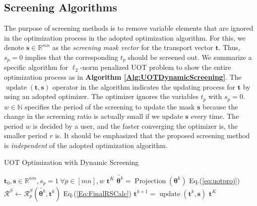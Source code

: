 \documentclass[twoside]{article}
\theoremstyle{plain}
\renewcommand{\vec}[1]{\bm{#1}}
\begin{document}
\subsection{Screening Algorithms}
The purpose of screening methods is to remove variable elements that are ignored in the optimization process in the adopted optimization algorithm. For this, we denote $\vec{s} \in \mathbb{R}^{mn}$ as the {\it screening mask vector} for the transport vector $\vec{t}$. Thus, $s_p = 0$ implies that the corresponding $t_p$ should be screened out. We summarize a specific algorithm for $\ell_2$-norm penalized UOT problem to show the entire optimization process as in {\bf Algorithm \ref{Alg:UOTDynamicScreening}}. The $\operatorname{update}(\vec{t},\vec s)$ operator in the algorithm indicates the updating process for $\vec{t}$ by using an adopted optimizer. The optimizer ignores the variables $t_p$ with $s_p =0$. $w \in \mathbb{N}$ specifies the period of the screening to update the mask $\vec s$ because the change in the screening ratio is actually small if we update $\vec s$ every time. The period $w$ is decided by a user, and the faster converging the optimizer is, the smaller period $r$ is. It should be emphasized that the proposed screening method is {\it independent} of the adopted optimization algorithm. 

 \begin{algorithm}
 \caption{UOT Optimization with Dynamic Screening}
 \begin{algorithmic}[h]
 \label{Alg:UOTDynamicScreening}
 \renewcommand{\algorithmicrequire}{\textbf{Input:}}
 \renewcommand{\algorithmicensure}{\textbf{Output:}}
 \REQUIRE $\vec{t}_0,  \vec s \in \mathbb{R}^{nm}, s_{p}=1\ \forall p \in [mn], w$
 \ENSURE $\vec t^{K}$
 \STATE $\tilde{\vec{\theta}^{k}} = \operatorname{Projection}(\vec{\theta}^k)$ \hfill Eq.(\ref{eq:uotproj})
 \STATE $\mathcal{R}^{S} \leftarrow \mathcal{R}_{p}^S{(\tilde{\vec{\theta}^{k}},\vec{t}^k)}$ \hfill Eq.(\ref{Eq:FinalRSCalc})
   \STATE{$\vec s \leftarrow {s_{p} = 0 \text{ if} {\displaystyle \max_{\vec{\theta} \in \mathcal{R}^S} {\vec x_{p}}^T\vec{\theta}^{k} <\lambda c_{p} }}$ \hfill Eq.(\ref{eq:kktineq})}
 \ENDFOR
  \ENDIF
  \STATE $\vec{t}^{k+1} = \operatorname{update}(\vec{t}^k,\vec s)$ \hfill {}
 \ENDFOR
  \RETURN $\vec{t}^{K} $
 \end{algorithmic}
 \end{algorithm}
\end{document}
